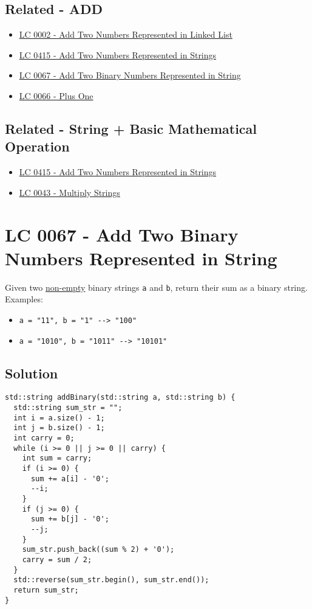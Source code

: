 \subsection*{Related - ADD}
\begin{itemize}
\item \hyperref[lc0002]{LC 0002 - Add Two Numbers Represented in Linked List}
\item \hyperref[lc0415]{LC 0415 - Add Two Numbers Represented in Strings}
\item \hyperref[lc0067]{LC 0067 - Add Two Binary Numbers Represented in String}
\item \hyperref[lc0066]{LC 0066 - Plus One}
\end{itemize}

\subsection*{Related - String + Basic Mathematical Operation}
\begin{itemize}
\item \hyperref[lc0415]{LC 0415 - Add Two Numbers Represented in Strings}
\item \hyperref[lc0043]{LC 0043 - Multiply Strings}
\end{itemize}

\section{LC 0067 - Add Two Binary Numbers Represented in String}\label{lc0067}
Given two \ul{non-empty} binary strings {\colorbox{CodeBackground}{\lstinline|a|}} and {\colorbox{CodeBackground}{\lstinline|b|}}, return their sum as a binary string.\\

Examples:
\begin{itemize}
	\item {\colorbox{CodeBackground}{\lstinline|a = "11", b = "1" --> "100"|}}
	\item {\colorbox{CodeBackground}{\lstinline|a = "1010", b = "1011" --> "10101"|}}
\end{itemize}

\subsection*{Solution}
\begin{lstlisting}
std::string addBinary(std::string a, std::string b) {
  std::string sum_str = "";
  int i = a.size() - 1;
  int j = b.size() - 1;
  int carry = 0;
  while (i >= 0 || j >= 0 || carry) {
    int sum = carry;
    if (i >= 0) {
      sum += a[i] - '0';
      --i;
    }
    if (j >= 0) {
      sum += b[j] - '0';
      --j;
    }
    sum_str.push_back((sum % 2) + '0');
    carry = sum / 2;
  }
  std::reverse(sum_str.begin(), sum_str.end());
  return sum_str;
}
\end{lstlisting}

